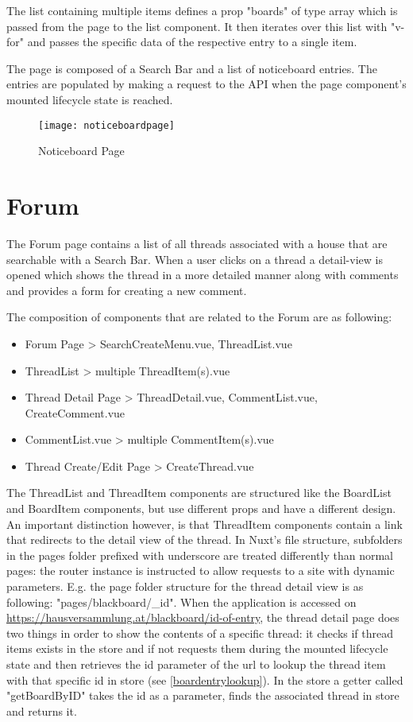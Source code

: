 The list containing multiple items defines a prop "boards" of type array which is passed from the page to the list component. It then iterates over this list with "v-for" and passes the specific data of the respective entry to a single item.

The page is composed of a Search Bar and a list of noticeboard entries. The entries are populated by making a request to the API when the page component's mounted lifecycle state is reached.

\begin{figure}[H]
  \begin{center}
  \texttt{[image: noticeboardpage]}
  \end{center}
  \caption{Noticeboard Page}
  \label{fig:langswitcher}
\end{figure}

\section{Forum}
The Forum page contains a list of all threads associated with a house that are searchable with a Search Bar. When a user clicks on a thread a detail-view is opened which shows the thread in a more detailed manner along with comments and provides a form for creating a new comment.

The composition of components that are related to the Forum are as following:

\begin{itemize}
  \item Forum Page > SearchCreateMenu.vue, ThreadList.vue
  \item ThreadList > multiple ThreadItem(s).vue
  \item Thread Detail Page > ThreadDetail.vue, CommentList.vue, CreateComment.vue
  \item CommentList.vue > multiple CommentItem(s).vue
  \item Thread Create/Edit Page > CreateThread.vue
\end{itemize}

The ThreadList and ThreadItem components are structured like the BoardList and BoardItem components, but use different props and have a different design. An important distinction however, is that ThreadItem components contain a link that redirects to the detail view of the thread. In Nuxt's file structure, subfolders in the pages folder prefixed with underscore are treated differently than normal pages: the router instance is instructed to allow requests to a site with dynamic parameters. E.g. the page folder structure for the thread detail view is as following: "pages/blackboard/\_id". When the application is accessed on \url{https://hausversammlung.at/blackboard/id-of-entry}, the thread detail page does two things in order to show the contents of a specific thread: it checks if thread items exists in the store and if not requests them during the mounted lifecycle state and then retrieves the id parameter of the url to lookup the thread item with that specific id in store (see \autoref{boardentrylookup}). In the store a getter called "getBoardByID" takes the id as a parameter, finds the associated thread in store and returns it. \newline

